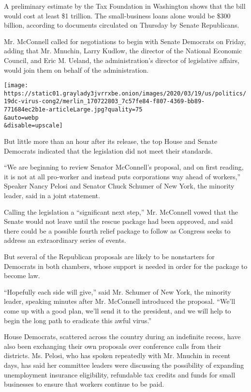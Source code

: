 A preliminary estimate by the Tax Foundation in Washington shows that
the bill would cost at least \$1 trillion. The small-business loans
alone would be \$300 billion, according to documents circulated on
Thursday by Senate Republicans.

Mr. McConnell called for negotiations to begin with Senate Democrats on
Friday, adding that Mr. Mnuchin, Larry Kudlow, the director of the
National Economic Council, and Eric M. Ueland, the administration's
director of legislative affairs, would join them on behalf of the
administration.

\texttt{[image: https://static01.graylady3jvrrxbe.onion/images/2020/03/19/us/politics/19dc-virus-cong2/merlin\_170722803\_7c57fe84-f807-4369-bb89-771684ec2b1e-articleLarge.jpg?quality=75\\\&auto=webp\\\&disable=upscale]}

But little more than an hour after its release, the top House and Senate
Democrats indicated that the legislation did not meet their standards.

``We are beginning to review Senator McConnell's proposal, and on first
reading, it is not at all pro-worker and instead puts corporations way
ahead of workers,'' Speaker Nancy Pelosi and Senator Chuck Schumer of
New York, the minority leader, said in a joint statement.

Calling the legislation a ``significant next step,'' Mr. McConnell vowed
that the Senate would not leave until the rescue package had been
approved, and said there could be a possible fourth relief package to
follow as Congress seeks to address an extraordinary series of events.

But several of the Republican proposals are likely to be nonstarters for
Democrats in both chambers, whose support is needed in order for the
package to become law.

``Hopefully each side will give,'' said Mr. Schumer of New York, the
minority leader, speaking minutes after Mr. McConnell introduced the
proposal. ``We'll come up with a good plan, we'll send it to the
president, and we will help to begin the long path to eradicate this
awful virus.''

House Democrats, scattered across the country during an indefinite
recess, have also been exchanging their own proposals over conference
calls from their districts. Ms. Pelosi, who has spoken repeatedly with
Mr. Mnuchin in recent days, has said her committee leaders were
discussing the possibility of expanding unemployment insurance
eligibility, refundable tax credits and funds for small businesses to
ensure that workers continue to be paid.

